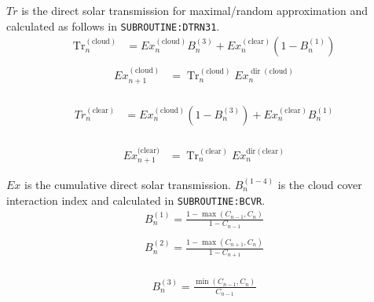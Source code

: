\(Tr\) is the direct solar transmission for maximal/random approximation
and calculated as follows in \texttt{SUBROUTINE:DTRN31}. \begin{equation}
\begin{aligned}
\operatorname{Tr}_{n}^{(\text {cloud})} &=E x_{n}^{(\text {cloud})} B_{n}^{(3)}+E x_{n}^{(\text {clear})}\left(1-B_{n}^{(1)}\right) \\
\end{aligned}
\end{equation} \begin{equation}
\begin{aligned}
E x_{n+1}^{(\text {cloud})} &=\operatorname{Tr}_{n}^{(\text {cloud})} E x_{n}^{\operatorname{dir}(\text {cloud})} \\
\end{aligned}
\end{equation}

\begin{equation}
\begin{aligned}
T r_{n}^{(\text {clear})} &=E x_{n}^{(\text {cloud})}\left(1-B_{n}^{(3)}\right)+E x_{n}^{(\text {clear})} B_{n}^{(1)} \\
\end{aligned}
\end{equation}

\begin{equation}
\begin{aligned}
E x_{n+1}^{(\text {clear)} }&=\operatorname{Tr}_{n}^{(\text {clear})} E x_{n}^{\text {dir}(\text {clear})}
\end{aligned}
\end{equation}

\(Ex\) is the cumulative direct solar transmission. \(B_{n}^{(1-4)}\) is
the cloud cover interaction index and calculated in
\texttt{SUBROUTINE:BCVR}. \begin{equation}
\begin{array}{l}
B_{n}^{(1)}=\frac{1-\max \left(C_{n-1}, C_{n}\right)}{1-C_{n-1}} \\
\end{array}
\end{equation} \begin{equation}
\begin{array}{l}
B_{n}^{(2)}=\frac{1-\max \left(C_{n+1}, C_{n}\right)}{1-C_{n+1}} \\
\end{array}
\end{equation}

\begin{equation}
\begin{array}{l}
B_{n}^{(3)}=\frac{\min \left(C_{n-1}, C_{n}\right)}{C_{n-1}} \\
\end{array}
\end{equation}


